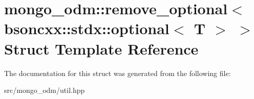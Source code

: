 \hypertarget{structmongo__odm_1_1remove__optional_3_01bsoncxx_1_1stdx_1_1optional_3_01T_01_4_01_4}{}\section{mongo\+\_\+odm\+:\+:remove\+\_\+optional$<$ bsoncxx\+:\+:stdx\+:\+:optional$<$ T $>$ $>$ Struct Template Reference}
\label{structmongo__odm_1_1remove__optional_3_01bsoncxx_1_1stdx_1_1optional_3_01T_01_4_01_4}


The documentation for this struct was generated from the following file\+:\begin{DoxyCompactItemize}
\item 
src/mongo\+\_\+odm/util.\+hpp\end{DoxyCompactItemize}
